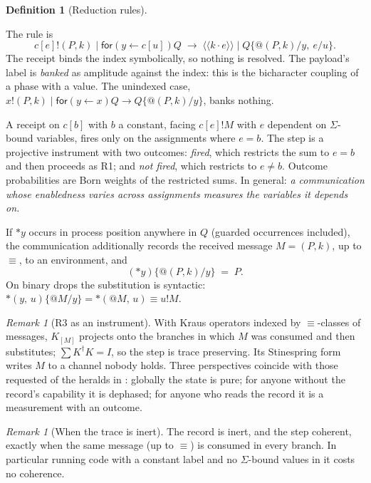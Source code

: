 \documentclass[11pt,a4paper]{article}
\theoremstyle{plain}
\theoremstyle{definition}
\newtheorem{definition}[theorem]{Definition}
\theoremstyle{remark}
\newtheorem{remark}[theorem]{Remark}
\newcommand{\cpl}[1]{\langle\!\langle #1 \rangle\!\rangle}
\newcommand{\rcv}[3]{\mathsf{for}(#1 \leftarrow #2)#3}
\newcommand{\drop}[1]{{*}#1}
\newcommand{\bdrop}[2]{{*}(#1,\,#2)}
\newcommand{\red}{\rightarrow}
\newcommand{\scong}{\equiv}
\begin{document}
\begin{definition}[Reduction rules]\label{def:red}
\begin{description}[leftmargin=2.5em,style=nextline]
\item[(R1) Coherent COMM] The rule is
  \[
  c[e]!(P,k)\mid\rcv{y}{c[u]}{Q}\;\red\;\cpl{k\cdot e}\mid Q\{@(P,k)/y,\ e/u\}.
  \]
  The receipt binds the index symbolically, so nothing is resolved. The
  payload's label is \emph{banked} as amplitude against the index: this is the
  bicharacter coupling of a phase with a value. The unindexed case,
  $x!(P,k)\mid\rcv{y}{x}{Q}\red Q\{@(P,k)/y\}$, banks nothing.
\item[(R2) Resolving COMM]
  A receipt on $c[b]$ with $b$ a constant, facing $c[e]!M$ with $e$ dependent
  on $\Sigma$-bound variables, fires only on the assignments where $e = b$.
  The step is a projective instrument with two outcomes: \emph{fired}, which
  restricts the sum to $e=b$ and then proceeds as R1; and \emph{not fired},
  which restricts to $e\neq b$. Outcome probabilities are Born weights of the
  restricted sums. In general: \emph{a communication whose enabledness varies
  across assignments measures the variables it depends on.}
\item[(R3) Traced execution]
  If $\drop{y}$ occurs in process position anywhere in $Q$ (guarded
  occurrences included), the communication additionally records the received
  message $M=(P,k)$, up to $\scong$, to an environment, and
  \[
  (\drop{y})\{@(P,k)/y\} \;=\; P.
  \]
  On binary drops the substitution is syntactic:
  $\bdrop{y}{u}\{@M/y\} = \bdrop{@M}{u}\scong u!M$.
\end{description}
\end{definition}

\begin{remark}[R3 as an instrument]
With Kraus operators indexed by $\scong$-classes of messages,
$K_{[M]}$ projects onto the branches in which $M$ was consumed and then
substitutes; $\sum K^\dagger K = I$, so the step is trace preserving. Its
Stinespring form writes $M$ to a channel nobody holds. Three perspectives
coincide with those requested of the heralds in \cite{GWv6}: globally the state
is pure; for anyone without the record's capability it is dephased; for anyone
who reads the record it is a measurement with an outcome.
\end{remark}

\begin{remark}[When the trace is inert]
The record is inert, and the step coherent, exactly when the same message (up
to $\scong$) is consumed in every branch. In particular running code with a
constant label and no $\Sigma$-bound values in it costs no coherence.
\end{remark}
\end{document}
